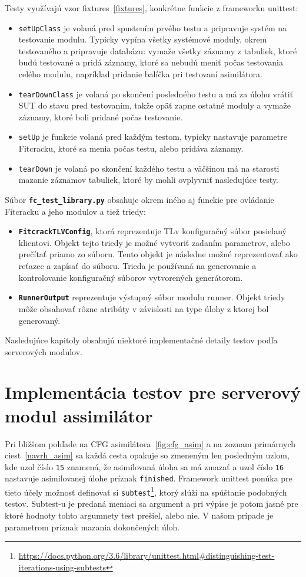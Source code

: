 Testy využívajú vzor fixtures~\ref{fixtures}, konkrétne funkcie z frameworku unittest:
\begin{itemize}
	\item \texttt{setUpClass} je volaná pred spustením prvého testu a pripravuje systém na testovanie modulu.
		Typicky vypína všetky systémové moduly, okrem testovaného a pripravuje databázu: vymaže všetky záznamy z tabuliek, ktoré budú testované a pridá záznamy, ktoré sa nebudú meniť počas testovania celého modulu, napríklad pridanie balíčka pri testovaní asimilátora.
	\item \texttt{tearDownClass}  je volaná po skončení posledného testu a má za úlohu vrátiť SUT do stavu pred testovaním, takže opäť zapne ostatné moduly a vymaže záznamy, ktoré boli pridané počas testovanie.
	\item \texttt{setUp} je funkcie volaná pred každým testom, typicky nastavuje parametre Fitcracku, ktoré sa menia počas testu, alebo pridáva záznamy.
	\item \texttt{tearDown} je volaná po skončení každého testu a väčšinou má na starosti mazanie záznamov tabuliek, ktoré by mohli ovplyvniť nasledujúce testy.
\end{itemize}

Súbor \textbf{\texttt{fc\_test\_library.py}} obsahuje okrem iného aj funckie pre ovládanie Fitcracku a jeho modulov a tiež triedy:
\begin{itemize}
	\item \textbf{\texttt{FitcrackTLVConfig}}, ktorá reprezentuje TLv konfiguračný súbor posielaný klientovi. 
		Objekt tejto triedy je možné vytvoriť zadaním parametrov, alebo prečítať priamo zo súboru.
		Tento objekt je následne možné reprezentovať ako reťazec a zapísať do súboru.
		Trieda je používaná na generovanie a kontrolovanie konfiguračný súborov vytvorených generátorom.
	\item \textbf{\texttt{RunnerOutput}} reprezentuje výstupný súbor modulu runner. Objekt triedy môže obsahovať rôzne atribúty v závislosti na type úlohy z ktorej bol generovaný.
\end{itemize}

Nasledujúce kapitoly obsahujú niektoré implementačné detaily testov podľa serverových modulov.

\section{Implementácia testov pre serverový modul assimilátor}
\label{impl_asim}
Pri bližšom pohľade na CFG asimilátora~\ref{fig:cfg_asim} a na zoznam primárnych ciest~\ref{navrh_asim} sa každá cesta opakuje so zmeneným len posledným uzlom, kde uzol číslo \texttt{15} znamená, že asimilovaná úloha sa má zmazať a uzol číslo \texttt{16} nastavuje asimilovanej úlohe príznak \texttt{finished}.
Framework unittest ponúka pre tieto účely možnosť definovať si \texttt{subtest}\footnote{\url{https://docs.python.org/3.6/library/unittest.html\#distinguishing-test-iterations-using-subtests}}, ktorý slúži na spúštanie podobných testov.
Subtest-u je predaná meniaci sa argument a pri výpise je potom jasné pre ktoré hodnoty tohto argumnety test prešiel, alebo nie.
V našom prípade je parametrom príznak mazania dokončených úloh.

